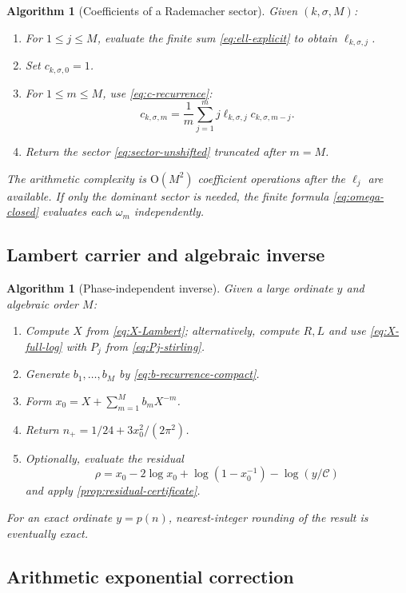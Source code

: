 \documentclass[11pt,a4paper]{article}
\numberwithin{equation}{section}
\newtheorem{algorithm}[theorem]{Algorithm}
\theoremstyle{remark}
\newcommand{\Ccal}{\mathcal C}
\newcommand{\bigO}{\mathrm O}
\begin{document}
\begin{algorithm}[Coefficients of a Rademacher sector]\label{alg:forward-sector}
Given $(k,\sigma,M)$:
\begin{enumerate}
\item For $1\le j\le M$, evaluate the finite sum \cref{eq:ell-explicit} to obtain $\ell_{k,\sigma,j}$.
\item Set $c_{k,\sigma,0}=1$.
\item For $1\le m\le M$, use \cref{eq:c-recurrence}:
\[
 c_{k,\sigma,m}=\frac1m\sum_{j=1}^{m}
 j\ell_{k,\sigma,j}c_{k,\sigma,m-j}.
\]
\item Return the sector \cref{eq:sector-unshifted} truncated after $m=M$.
\end{enumerate}
The arithmetic complexity is $\bigO(M^2)$ coefficient operations after the $\ell_j$ are available.  If only the dominant sector is needed, the finite formula \cref{eq:omega-closed} evaluates each $\omega_m$ independently.
\end{algorithm}

\subsection{Lambert carrier and algebraic inverse}

\begin{algorithm}[Phase-independent inverse]\label{alg:dominant-inverse}
Given a large ordinate $y$ and algebraic order $M$:
\begin{enumerate}
\item Compute $X$ from \cref{eq:X-Lambert}; alternatively, compute $R,L$ and use \cref{eq:X-full-log} with $P_j$ from \cref{eq:Pj-stirling}.
\item Generate $b_1,\ldots,b_M$ by \cref{eq:b-recurrence-compact}.
\item Form $x_0=X+\sum_{m=1}^{M}b_mX^{-m}$.
\item Return $n_+=1/24+3x_0^2/(2\pi^2)$.
\item Optionally, evaluate the residual
\[
 \rho=x_0-2\log x_0+\log(1-x_0^{-1})-\log(y/\Ccal)
\]
and apply \cref{prop:residual-certificate}.
\end{enumerate}
For an exact ordinate $y=p(n)$, nearest-integer rounding of the result is eventually exact.
\end{algorithm}

\subsection{Arithmetic exponential correction}
\end{document}
